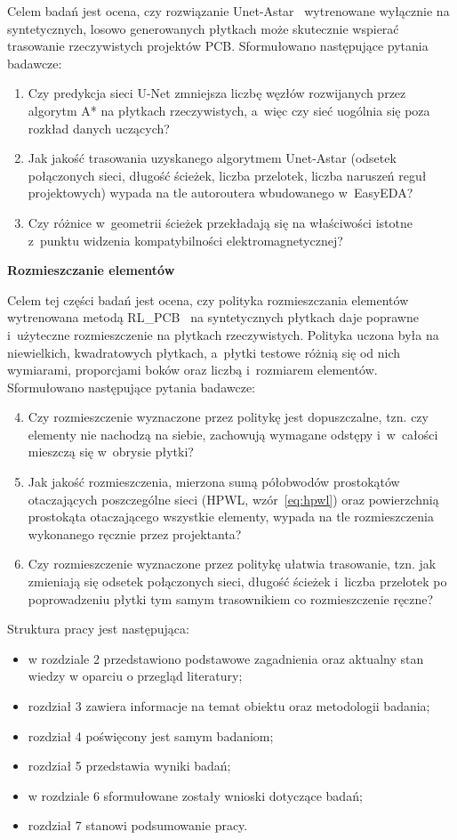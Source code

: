 Celem badań jest ocena, czy rozwiązanie Unet-Astar~\cite{Yin2023UnetAstar}
wytrenowane wyłącznie na syntetycznych, losowo generowanych płytkach może
skutecznie wspierać trasowanie rzeczywistych projektów PCB. Sformułowano
następujące pytania badawcze:
\begin{enumerate}
  \item Czy predykcja sieci U-Net zmniejsza liczbę węzłów rozwijanych przez
    algorytm A* na płytkach rzeczywistych, a~więc czy sieć uogólnia się poza
    rozkład danych uczących?
  \item Jak jakość trasowania uzyskanego algorytmem Unet-Astar (odsetek
    połączonych sieci, długość ścieżek, liczba przelotek, liczba naruszeń reguł
    projektowych) wypada na tle autoroutera wbudowanego w~EasyEDA?
  \item Czy różnice w~geometrii ścieżek przekładają się na właściwości istotne
    z~punktu widzenia kompatybilności elektromagnetycznej?
\end{enumerate}
\textbf{Rozmieszczanie elementów}
\label{sec:cel-rozmieszczanie}

Celem tej części badań jest ocena, czy polityka rozmieszczania elementów
wytrenowana metodą RL\_PCB~\cite{Vassallo2024RLPCB} na syntetycznych
płytkach daje poprawne i~użyteczne rozmieszczenie na płytkach rzeczywistych.
Polityka uczona była na niewielkich, kwadratowych płytkach, a~płytki testowe
różnią się od nich wymiarami, proporcjami boków oraz liczbą i~rozmiarem
elementów. Sformułowano następujące pytania badawcze:
\begin{enumerate}
  \setcounter{enumi}{3}
  \item Czy rozmieszczenie wyznaczone przez politykę jest dopuszczalne, tzn.
    czy elementy nie nachodzą na siebie, zachowują wymagane odstępy
    i~w~całości mieszczą się w~obrysie płytki?
  \item Jak jakość rozmieszczenia, mierzona sumą półobwodów prostokątów
    otaczających poszczególne sieci (HPWL, wzór~\ref{eq:hpwl}) oraz
    powierzchnią prostokąta otaczającego wszystkie elementy, wypada na tle
    rozmieszczenia wykonanego ręcznie przez projektanta?
  \item Czy rozmieszczenie wyznaczone przez politykę ułatwia trasowanie, tzn.
    jak zmieniają się odsetek połączonych sieci, długość ścieżek i~liczba
    przelotek po poprowadzeniu płytki tym samym trasownikiem co
    rozmieszczenie ręczne?
\end{enumerate}

Struktura pracy jest następująca:
\begin{itemize}
    \item w rozdziale 2 przedstawiono podstawowe zagadnienia oraz aktualny stan wiedzy w oparciu o przegląd literatury;
    \item rozdział 3 zawiera informacje na temat obiektu oraz metodologii badania;
    \item rozdział 4 poświęcony jest samym badaniom;
    \item rozdział 5 przedstawia wyniki badań;
    \item w rozdziale 6 sformułowane zostały wnioski dotyczące badań;
    \item rozdział 7 stanowi podsumowanie pracy.
\end{itemize}
